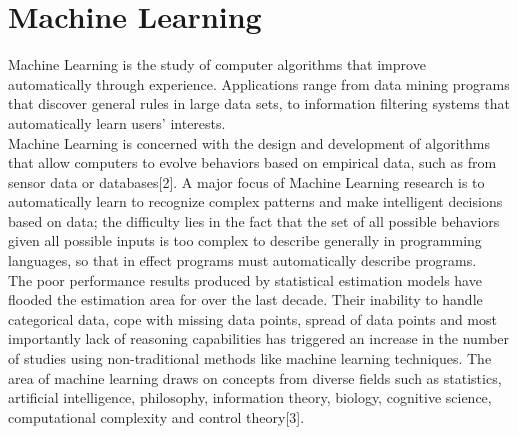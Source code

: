 \section{Machine Learning }
Machine Learning  is  the  study  of  computer  algorithms  that  improve  automatically through experience. Applications range from data mining programs that discover general rules in large  data  sets,  to  information  filtering  systems  that  automatically  learn  users' interests. 
\\
Machine Learning is concerned with the design and development of algorithms that allow computers to  evolve  behaviors  based  on  empirical  data,  such  as  from  sensor  data  or databases[2].  A major  focus  of  Machine  Learning  research  is  to  automatically  learn  to recognize complex  patterns  and make intelligent  decisions  based on  data;  the difficulty lies  in  the  fact  that  the  set  of  all  possible  behaviors  given  all  possible  inputs  is  too complex to describe generally in programming languages, so that in effect programs must automatically describe programs.
\\
The poor performance results produced by statistical estimation models have flooded the estimation area for over the last decade. Their inability to handle categorical data, cope with  missing data  points,  spread  of data  points  and  most  importantly  lack  of  reasoning capabilities  has  triggered  an  increase  in  the  number  of  studies  using  non-traditional methods  like  machine  learning  techniques.  The  area  of  machine  learning  draws  on concepts  from  diverse  fields  such  as  statistics,  artificial  intelligence,  philosophy, information  theory,  biology,  cognitive  science,  computational  complexity  and  control theory[3].
\\
\\
\\
\\
\\



